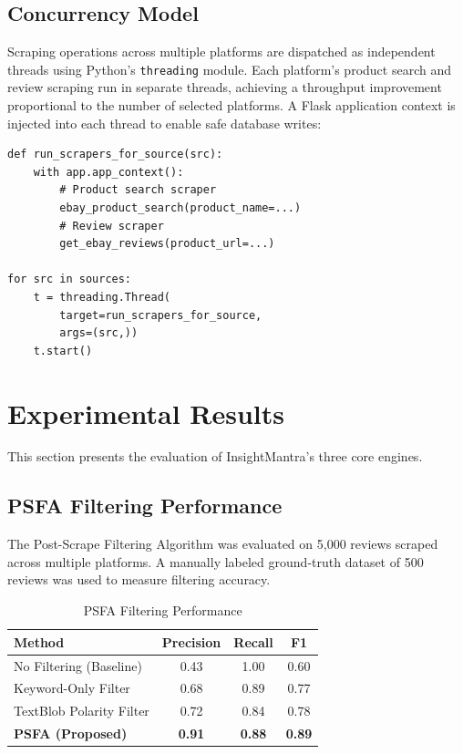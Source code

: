 \documentclass[conference]{IEEEtran}
\begin{document}
\subsection{Concurrency Model}

Scraping operations across multiple platforms are dispatched as independent threads using Python's \texttt{threading} module. Each platform's product search and review scraping run in separate threads, achieving a throughput improvement proportional to the number of selected platforms. A Flask application context is injected into each thread to enable safe database writes:

\begin{verbatim}
def run_scrapers_for_source(src):
    with app.app_context():
        # Product search scraper
        ebay_product_search(product_name=...)
        # Review scraper
        get_ebay_reviews(product_url=...)

for src in sources:
    t = threading.Thread(
        target=run_scrapers_for_source,
        args=(src,))
    t.start()
\end{verbatim}

\section{Experimental Results}

This section presents the evaluation of InsightMantra's three core engines.

\subsection{PSFA Filtering Performance}

The Post-Scrape Filtering Algorithm was evaluated on 5,000 reviews scraped across multiple platforms. A manually labeled ground-truth dataset of 500 reviews was used to measure filtering accuracy.

\begin{table}[htbp]
\caption{PSFA Filtering Performance}
\begin{center}
\begin{tabular}{lccc}
\toprule
\textbf{Method} & \textbf{Precision} & \textbf{Recall} & \textbf{F1} \\
\midrule
No Filtering (Baseline) & 0.43 & 1.00 & 0.60 \\
Keyword-Only Filter & 0.68 & 0.89 & 0.77 \\
TextBlob Polarity Filter & 0.72 & 0.84 & 0.78 \\
\textbf{PSFA (Proposed)} & \textbf{0.91} & \textbf{0.88} & \textbf{0.89} \\
\bottomrule
\end{tabular}
\label{tab:psfa_results}
\end{center}
\end{table}
\end{document}
